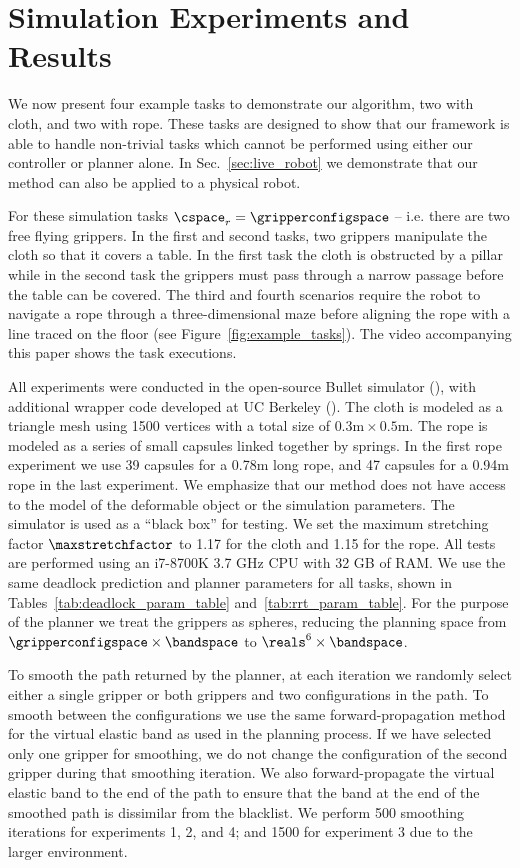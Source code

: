 \section{Simulation Experiments and Results}
\label{sec:simulation_experiments}

We now present four example tasks to demonstrate our algorithm, two with cloth, and two with rope. These tasks are designed to show that our framework is able to handle non-trivial tasks which cannot be performed using either our controller or planner alone. In Sec.~\ref{sec:live_robot} we demonstrate that our method can also be applied to a physical robot.

For these simulation tasks $\cspace_r = \gripperconfigspace$ -- i.e. there are two free flying grippers. In the first and second tasks, two grippers manipulate the cloth so that it covers a table. In the first task the cloth is obstructed by a pillar while in the second task the grippers must pass through a narrow passage before the table can be covered. The third and fourth scenarios require the robot to navigate a rope through a three-dimensional maze before aligning the rope with a line traced on the floor (see Figure~\ref{fig:example_tasks}). The video accompanying this paper shows the task executions.


All experiments were conducted in the open-source Bullet simulator (\cite{Coumans2010}), with additional wrapper code developed at UC Berkeley 
(\cite{ucberkley_bullet}). The cloth is modeled as a triangle mesh using 1500 vertices with a total size of $0.3\text{m} \times 0.5\text{m}$. The rope is modeled as a series of small capsules linked together by springs. In the first rope experiment we use 39 capsules for a 0.78m long rope, and 47 capsules for a 0.94m rope in the last experiment. We emphasize that our method does not have access to the model of the deformable object or the simulation parameters. The simulator is used as a ``black box'' for testing. We set the maximum stretching factor $\maxstretchfactor$ to 1.17 for the cloth and 1.15 for the rope. All tests are performed using an i7-8700K 3.7 GHz CPU with 32 GB of RAM. We use the same deadlock prediction and planner parameters for all tasks, shown in Tables~\ref{tab:deadlock_param_table} and~\ref{tab:rrt_param_table}. For the purpose of the planner we treat the grippers as spheres, reducing the planning space from $\gripperconfigspace \times \bandspace$ to $\reals^6 \times \bandspace$.

To smooth the path returned by the planner, at each iteration we randomly select either a single gripper or both grippers and two configurations in the path. To smooth between the configurations we use the same forward-propagation method for the virtual elastic band as used in the planning process. If we have selected only one gripper for smoothing, we do not change the configuration of the second gripper during that smoothing iteration. We also forward-propagate the virtual elastic band to the end of the path to ensure that the band at the end of the smoothed path is dissimilar from the blacklist. We perform 500 smoothing iterations for experiments 1, 2, and 4; and 1500 for experiment 3 due to the larger environment.




